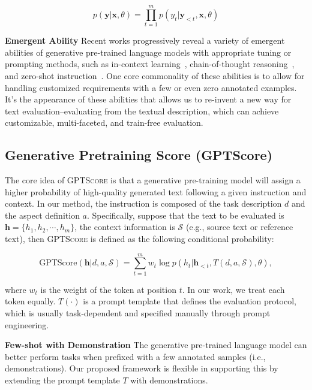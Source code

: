 \begin{equation*}
    p(\bm{y}|\bm{x}, \theta) = \prod_{t=1}^{m}p(y_t | \bm{y}_{<t}, \bm{x}, \theta)
\end{equation*}

\textbf{Emergent Ability} Recent works progressively reveal a variety  of emergent abilities of generative pre-trained language models with appropriate tuning or prompting methods, such as in-context learning~\cite{sewon:in-context}, chain-of-thought reasoning~\cite{jason2022chain}, and zero-shot instruction~\cite{ouyang2022training}. One core commonality of these abilities is to allow for handling customized requirements with a few or even zero annotated examples. It's the appearance of these abilities that allows us to re-invent a new way for text evaluation--evaluating from the textual description, which can achieve customizable, multi-faceted, and train-free evaluation.

\subsection{Generative Pretraining Score (GPTScore)} The core idea of \textsc{GPTScore} is that a generative pre-training model will assign a higher probability of high-quality generated text following a given instruction and context. In our method, the instruction is composed of the task description $d$ and the aspect definition $a$. Specifically, suppose that the text to be evaluated is $\bm{h} = \{h_1, h_2, \cdots, h_m\}$, the context information is $\mathcal{S}$ (e.g., source text or reference text), then \textsc{GPTScore} is defined as the following conditional probability:

\begin{equation*}
    \mathrm{GPTScore}(\bm{h}|d, a, \mathcal{S}) = \sum_{t=1}^{m} w_t \log p(h_t |\bm{h}_{<t}, T(d, a, \mathcal{S}), \theta),
\end{equation*}

where $w_t$ is the weight of the token at position $t$. In our work, we treat each token equally. $T(\cdot)$ is a prompt template that defines the evaluation protocol, which is usually task-dependent and specified manually through prompt engineering.

\textbf{Few-shot with Demonstration} \quad The generative pre-trained language model can better perform tasks when prefixed with a few annotated samples (i.e., demonstrations). Our proposed framework is flexible in supporting this by extending the prompt template $T$ with demonstrations. 

